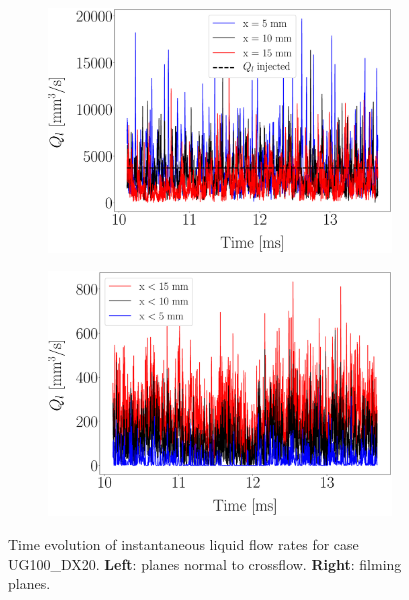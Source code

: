 \begin{figure}[ht]
\centering
\begin{subfigure}[b]{0.45\textwidth}
	\centering
   \includegraphics[scale=0.15]{./part2_developments/figures_ch5_resolved_JICF/flow_rates_ibs/uG100_dx20_QL_isox_time_evol.eps}
\end{subfigure}
\begin{subfigure}[b]{0.45\textwidth}
	\centering
   \includegraphics[scale=0.15]{./part2_developments/figures_ch5_resolved_JICF/flow_rates_ibs/uG100_dx20_QL_filming_time_evol.eps}
\end{subfigure}
\caption{Time evolution of instantaneous liquid flow rates for case UG100\_DX20. \textbf{Left}: planes normal to crossflow. \textbf{Right}: filming planes.}
\label{fig:IB_liquid_flow_rate_inst_evolution_UG100_DX20}
\end{figure}

